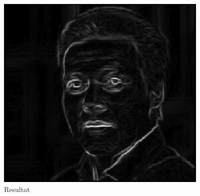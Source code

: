 \documentclass{article}
\begin{document}
	\begin{figure}
		\centering
		\includegraphics[width=4in]{test3_result.jpg}
		\caption{Resultat}
		\label{ke3r}
	\end{figure}
\end{document}
